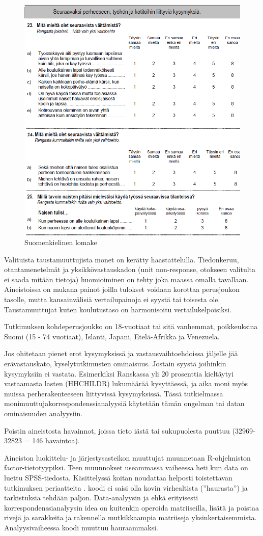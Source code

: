 \documentclass[
  finnish,
]{book}
\begin{document}
\begin{figure}

{\centering \includegraphics[width=0.5\linewidth]{img/substvar_fi_Q1Q2} 

}

\caption{Suomenkielinen lomake}\label{fig:suom-kys}
\end{figure}

Valituista taustamuuttujista monet on kerätty haastattelulla.
Tiedonkeruu, otantamenetelmät ja yksikkövastauskadon (unit non-response, otokseen
valitulta ei saada mitään tietoja) huomioiminen on tehty joka
maassa omalla tavallaan. Aineistoissa on mukana painot joilla tulokset voidaan
korottaa perusjoukon tasolle, mutta kansainvälisiä vertailupainoja ei syystä tai
toisesta ole. Taustamuuttujat kuten koulutustaso on harmonisoitu
vertailukelpoisiksi.

Tutkimuksen kohdeperusjoukko on 18-vuotiaat tai sitä vanhemmat,
poikkeuksina Suomi (15 - 74 vuotiaat), Islanti, Japani, Etelä-Afrikka ja Venezuela.

Jos ohitetaan pienet erot kysymyksissä ja vastausvaihtoehdoissa jäljelle jää
erävastauskato, kyselytutkimusten ominaisuus. Jostain syystä joihinkin kysymyksiin
ei vastata. Esimerkiksi Ranskassa yli 20 prosenttia kieltäytyi vastaamasta lasten
(HHCHILDR) lukumäärää kysyttäessä, ja aika moni myös muissa perherakenteeseen
liittyvissä kysymyksissä. Tässä tutkielmassa monimuuttujakorrespondenssianalyysiä
käytetään tämän ongelman tai datan ominaisuuden analyysiin.

Poistin aineistosta havainnot, joissa tieto iästä tai sukupuolesta puuttuu
(32969-32823 = 146 havaintoa).

Aineiston luokittelu- ja järjestysasteikon muuttujat muunnetaan R-ohjelmiston
factor-tietotyypiksi. Teen muunnokset useammassa vaiheessa heti kun data on
luettu SPSS-tiedosta. Käsittelyssä koitan noudattaa helposti toistettavan
tutkimuksen periaatteita \citep{RefWorks:doc:5c3759c2e4b0085b307c82b5}.
koodi ei saisi olla kovin virhealtista (''haurasta'') ja tarkistuksia tehdään
paljon. Data-analyysin ja ehkä erityisesti korrespondenssianalyysin idea on
kuitenkin operoida matriiseilla, lisätä ja poistaa rivejä ja sarakkeita ja
rakennella mutkikkaampia matriiseja yksinkertaisemmista.
Analyysivaiheessa koodi muuttuu hauraammaksi.
\end{document}
